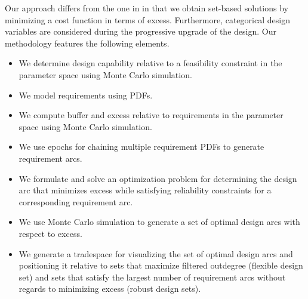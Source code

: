 Our approach differs from the one in \cite{Cardin2017} in that we obtain set-based solutions by minimizing a cost function in terms of excess. Furthermore, categorical design variables are considered during the progressive upgrade of the design. 
%
Our methodology features the following elements.
\begin{itemize}
	\item We determine design capability relative to a feasibility constraint in the parameter space using Monte Carlo simulation.
	\item We model requirements using \acp{PDF}.
	\item We compute buffer and excess relative to requirements in the parameter space using Monte Carlo simulation.
	\item We use epochs for chaining multiple requirement \acp{PDF} to generate requirement arcs.
	\item We formulate and solve an optimization problem \cite{Rapp2018} for determining the design arc that minimizes excess while satisfying reliability constraints for a corresponding requirement arc.
	\item We use Monte Carlo simulation to generate a set of optimal design arcs with respect to excess.
	\item We generate a tradespace for visualizing the set of optimal design arcs and positioning it relative to sets that maximize filtered outdegree (flexible design set) and sets that satisfy the largest number of requirement arcs without regards to minimizing excess (robust design sets).
\end{itemize}

